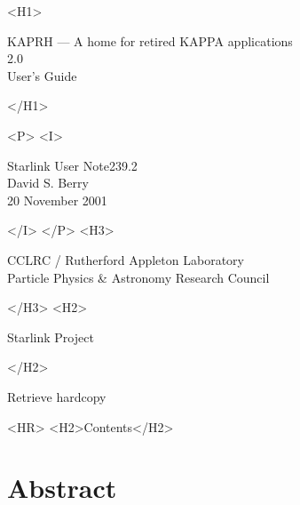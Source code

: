 \documentclass[twoside,11pt]{article}
\newcommand{\stardoccategory}  {Starlink User Note}
\newcommand{\stardocsource}    {sun239.2}
\newcommand{\stardocnumber}    {239.2}
\newcommand{\stardocauthors}   {David S. Berry}
\newcommand{\stardocdate}      {20 November 2001}
\newcommand{\stardoctitle}     {KAPRH ---  A home for retired KAPPA applications}
\newcommand{\stardocversion}   {2.0}
\newcommand{\stardocmanual}    {User's Guide}
\newcommand{\htmladdnormallink}[2]{#1}
\newcommand{\htmladdimg}[1]{}
\newcommand{\htmlref}[2]{#1}
\newcommand{\htmladdtonavigation}[1]{}
\newcommand{\xlabel}[1]{}
\newcommand{\latexonlytoc}[0]{\tableofcontents}
\begin{document}
\begin{htmlonly}
   \xlabel{}
   \begin{rawhtml} <H1> \end{rawhtml}
      \stardoctitle\\
      \stardocversion\\
      \stardocmanual
   \begin{rawhtml} </H1> \end{rawhtml}


   \begin{rawhtml} <P> <I> \end{rawhtml}
   \stardoccategory \stardocnumber \\
   \stardocauthors \\
   \stardocdate
   \begin{rawhtml} </I> </P> <H3> \end{rawhtml}
      \htmladdnormallink{CCLRC}{http://www.cclrc.ac.uk} /
      \htmladdnormallink{Rutherford Appleton Laboratory}
                        {http://www.cclrc.ac.uk/ral} \\
      \htmladdnormallink{Particle Physics \& Astronomy Research Council}
                        {http://www.pparc.ac.uk} \\
   \begin{rawhtml} </H3> <H2> \end{rawhtml}
      \htmladdnormallink{Starlink Project}{http://www.starlink.rl.ac.uk/}
   \begin{rawhtml} </H2> \end{rawhtml}
   \htmladdnormallink{\htmladdimg{source.gif} Retrieve hardcopy}
      {http://www.starlink.rl.ac.uk/cgi-bin/hcserver?\stardocsource}\\

  \label{stardoccontents}
  \begin{rawhtml} 
    <HR>
    <H2>Contents</H2>
  \end{rawhtml}
  \renewcommand{\latexonlytoc}[0]{}
  \htmladdtonavigation{\htmlref{\htmladdimg{contents_motif.gif}}
        {stardoccontents}}

  \section{\xlabel{abstract}Abstract}
\end{htmlonly}
\end{document}
